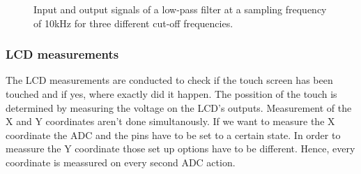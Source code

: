\begin{figure}[!h]
  \centering
  \caption{Input and output signals of a low-pass filter at a sampling frequency of 10kHz for three different cut-off frequencies.}
  \label{fig:filter}
\end{figure}




\subsubsection{LCD measurements}
The LCD measurements are conducted to check if the touch screen has been touched and if yes, where exactly did it happen. The possition of the touch is determined by measuring the voltage on the LCD's outputs. Measurement of the X and Y coordinates aren't done simultanously. If we want to measure the X coordinate the ADC and the pins have to be set to a certain state. In order to meassure the Y coordinate those set up options have to be different. Hence, every coordinate is meassured on every second ADC action.

 
